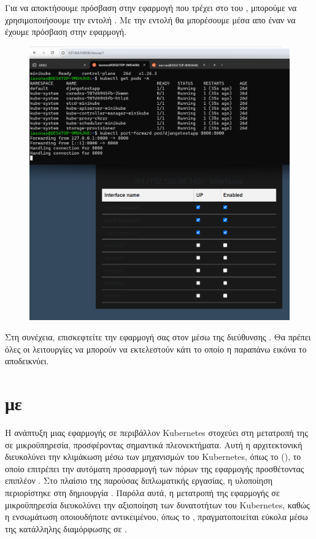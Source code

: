 Για να αποκτήσουμε πρόσβαση στην εφαρμογή  που τρέχει στο  του , 
μπορούμε να χρησιμοποιήσουμε την εντολή . Με την εντολή  θα μπορέσουμε μέσα απο έναν 
να έχουμε πρόσβαση στην εφαρμογή.

\FloatBarrier

\begin{figure}[h]
	\centering
	\includegraphics[width=1.0\textwidth]{graphics/kubernetes_proxy.png}
	\caption{}
\end{figure}

\FloatBarrier

\noindent  Στη συνέχεια, επισκεφτείτε την εφαρμογή σας στον  μέσω της διεύθυνσης . Θα πρέπει όλες οι λειτουργίες
να μπορούν να εκτελεστούν κάτι το οποίο η παραπάνω εικόνα το αποδεικνύει. 


\section{ με }

Η ανάπτυξη μιας εφαρμογής σε περιβάλλον Kubernetes στοχεύει στη μετατροπή της σε μικροϋπηρεσία, προσφέροντας σημαντικά πλεονεκτήματα. Αυτή η αρχιτεκτονική διευκολύνει την κλιμάκωση μέσω των μηχανισμών του Kubernetes, όπως το  (), το οποίο επιτρέπει την αυτόματη προσαρμογή των πόρων της εφαρμογής προσθέτοντας επιπλέον . Στο πλαίσιο της παρούσας διπλωματικής εργασίας, η υλοποίηση περιορίστηκε στη δημιουργία . Παρόλα αυτά, η μετατροπή της εφαρμογής σε μικροϋπηρεσία διευκολύνει την αξιοποίηση των δυνατοτήτων του Kubernetes, καθώς η ενσωμάτωση οποιουδήποτε αντικειμένου, όπως το , πραγματοποιείται εύκολα μέσω της κατάλληλης διαμόρφωσης σε .

